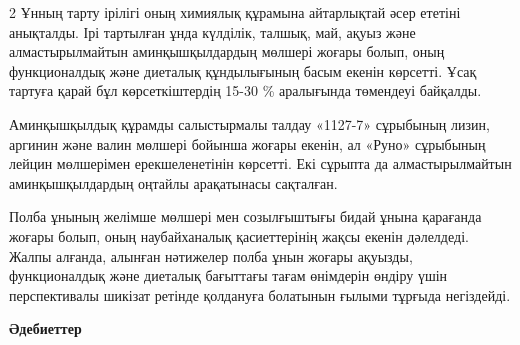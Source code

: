 \begin{multicols}{2}
Ұнның тарту ірілігі оның химиялық құрамына айтарлықтай әсер ететіні
анықталды. Ірі тартылған ұнда күлділік, талшық, май, ақуыз және
алмастырылмайтын аминқышқылдардың мөлшері жоғары болып, оның
функционалдық және диеталық құндылығының басым екенін көрсетті. Ұсақ
тартуға қарай бұл көрсеткіштердің 15-30 \% аралығында төмендеуі
байқалды.

Аминқышқылдық құрамды салыстырмалы талдау «1127-7» сұрыбының лизин,
аргинин және валин мөлшері бойынша жоғары екенін, ал «Руно» сұрыбының
лейцин мөлшерімен ерекшеленетінін көрсетті. Екі сұрыпта да
алмастырылмайтын аминқышқылдардың оңтайлы арақатынасы сақталған.

Полба ұнының желімше мөлшері мен созылғыштығы бидай ұнына қарағанда
жоғары болып, оның наубайханалық қасиеттерінің жақсы екенін дәлелдеді.
Жалпы алғанда, алынған нәтижелер полба ұнын жоғары ақуызды,
функционалдық және диеталық бағыттағы тағам өнімдерін өндіру үшін
перспективалы шикізат ретінде қолдануға болатынын ғылыми тұрғыда
негіздейді.
\end{multicols}

\begin{center}
{\bfseries Әдебиеттер}
\end{center}

